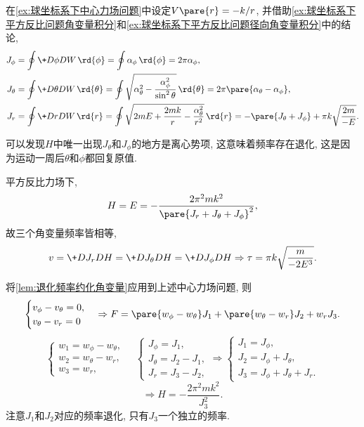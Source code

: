 \documentclass[../TheoreticalMechanics.tex]{subfiles}
\begin{document}
\begin{ex}
    \label{ex:中心力场问题下的角变量共轭}
    在\cref{ex:球坐标系下中心力场问题}中设定$V\pare{r} = -k/r$, 并借助\cref{ex:球坐标系下平方反比问题角变量积分}和\cref{ex:球坐标系下平方反比问题径向角变量积分}中的结论,
    \begin{align*}
        J_\phi &= \oint \+D\phi DW\,\rd{\phi} = \oint \alpha_\phi\,\rd{\phi} = 2\pi\alpha_\phi, \\
        J_\theta &= \oint \+D\theta DW\,\rd{\theta} = \oint \sqrt{\alpha_\theta^2 - \frac{\alpha_\phi^2}{\sin^2\theta}}\,\rd{\theta} = 2\pi\pare{\alpha_\theta-\alpha_\phi},\\
        J_r &= \oint \+DrDW\,\rd{r} = \oint \sqrt{2mE + \frac{2mk}{r} - \frac{\alpha_\theta^2}{r^2}}\,\rd{r} = -\pare{J_\theta + J_\phi} + \pi k\sqrt{\frac{2m}{-E}}.
    \end{align*}
\end{ex}
\begin{remark}
    可以发现$H$中唯一出现$J_\theta$和$J_\phi$的地方是离心势项, 这意味着频率存在退化, 这是因为运动一周后$\theta$和$\phi$都回复原值.
\end{remark}
\begin{theorem}[平方反比力场的退化频率]
    平方反比力场下,
    \[ H = E = -\frac{2\pi^2 mk^2}{\pare{J_r+J_\theta+J_\phi}^2}, \]
    故三个角变量频率皆相等,
    \[ v = \+D{J_r}D{H} = \+D{J_\theta}DH = \+D{J_\phi}DH \Rightarrow \tau = \pi k\sqrt{\frac{m}{-2E^3}}. \]
\end{theorem}
\begin{ex}
    将\cref{lem:退化频率约化角变量}应用到上述中心力场问题, 则
    \[ \begin{cases}
        v_\phi - v_\theta = 0,\\
        v_\theta - v_r = 0
    \end{cases} \Rightarrow F = \pare{w_\phi - w_\theta}J_1 + \pare{w_\theta - w_r}J_2 + w_rJ_3. \]
    \[ \begin{cases}
        w_1 = w_\phi - w_\theta,\\
        w_2 = w_\theta - w_r,\\
        w_3 = w_r,
    \end{cases}\quad \begin{cases}
        J_\phi = J_1,\\
        J_\theta = J_2 - J_1,\\
        J_r = J_3 - J_2,
    \end{cases}\Rightarrow \begin{cases}
        J_1 = J_\phi,\\
        J_2 = J_\phi + J_\theta,\\
        J_3 = J_\phi + J_\theta + J_r.
    \end{cases} \]
    \[ \Rightarrow H = -\frac{2\pi^2mk^2}{J_3^2}. \]
    注意$J_1$和$J_2$对应的频率退化, 只有$J_3$一个独立的频率.
\end{ex}
\end{document}
